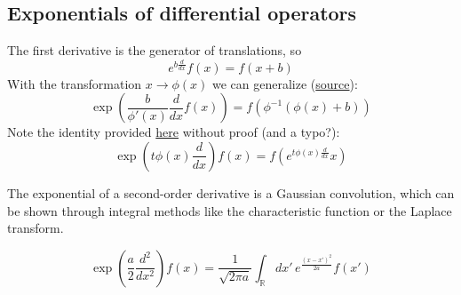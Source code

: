 \documentclass{article}
\newcommand{\intR}{\int_{\mathbb{R}}}
\begin{document}
\subsection*{Exponentials of differential operators}

The first derivative is the generator of translations, so
\begin{equation}
  e^{b \frac{d}{dx}} f(x) = f(x+b)
  \label{eq:exp_d}
\end{equation}
With the transformation $x \to \phi(x)$ we can generalize
(\href{https://math.stackexchange.com/questions/1465315/how-to-derive-these-lie-series-formulas}{source}):
\begin{equation}
  \exp\left(\frac{b}{\phi'(x)} \frac{d}{dx} f(x)\right) = f\left(\phi^{-1}\left(\phi(x)+b\right)\right)
  \label{eq:exp_func_d}
\end{equation}
Note the identity provided
\href{https://math.stackexchange.com/questions/719487/exponential-of-a-function-times-derivative}{here}
without proof (and a typo?):
\begin{equation}
  \exp\left(t \phi(x) \frac{d}{dx}\right) f(x) = f\left( e^{t \phi(x) \frac{d}{dx}}x \right)
\end{equation}

The exponential of a second-order derivative is a Gaussian convolution, which
can be shown through integral methods like the characteristic function or the
Laplace transform.

\begin{equation}
  \exp\left(\frac{a}{2} \frac{d^2}{dx^2}\right)f(x) = \frac{1}{\sqrt{2\pi a}} \intR dx' \, e^{\frac{(x-x')^2}{2a}} f(x')
  \label{eq:exp_d2}
\end{equation}
\end{document}
